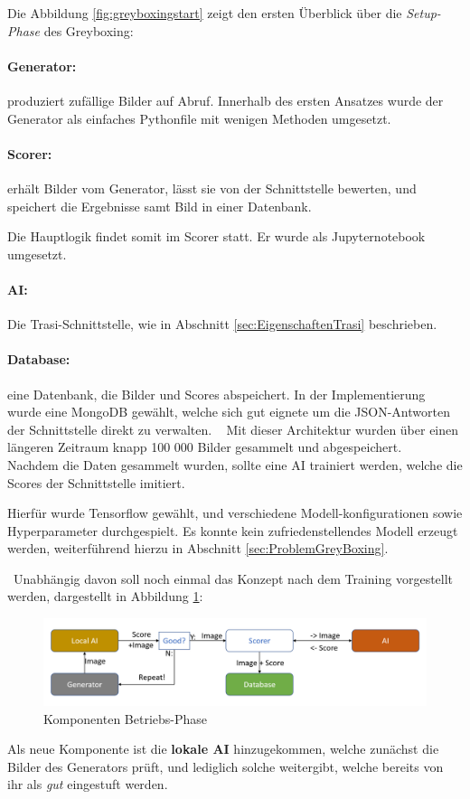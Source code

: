 Die Abbildung \ref{fig:greyboxingstart} zeigt den ersten Überblick über die \textit{Setup-Phase} des Greyboxing:

\paragraph{Generator:} produziert zufällige Bilder auf Abruf. Innerhalb des ersten Ansatzes wurde der Generator als einfaches Pythonfile mit wenigen Methoden umgesetzt.  
\paragraph{Scorer:} erhält Bilder vom Generator, lässt sie von der Schnittstelle bewerten, und speichert die Ergebnisse samt Bild in einer Datenbank. 

Die Hauptlogik findet somit im Scorer statt. Er wurde als Jupyternotebook umgesetzt.
\paragraph{AI:} Die Trasi-Schnittstelle, wie in Abschnitt \ref{sec:EigenschaftenTrasi} beschrieben.
\paragraph{Database:} eine Datenbank, die Bilder und Scores abspeichert.
In der Implementierung wurde eine MongoDB gewählt, welche sich gut eignete um die JSON-Antworten der Schnittstelle direkt zu verwalten. 
~\newline
Mit dieser Architektur wurden über einen längeren Zeitraum knapp 100 000 Bilder gesammelt und abgespeichert. 
~\newline
Nachdem die Daten gesammelt wurden, sollte eine AI trainiert werden, welche die Scores der Schnittstelle imitiert. 

Hierfür wurde Tensorflow gewählt, und verschiedene Modell-konfigurationen sowie Hyperparameter durchgespielt. 
Es konnte kein zufriedenstellendes Modell erzeugt werden, weiterführend hierzu in Abschnitt \ref{sec:ProblemGreyBoxing}.

~\newline Unabhängig davon soll noch einmal das Konzept nach dem Training vorgestellt werden, dargestellt in Abbildung \ref{fig:greyboxingrunning}: 
 \begin{figure}[h]
 	\centering
 	\includegraphics[width=0.9\linewidth]{Images/GreyBoxingRunning}
 	\caption{Komponenten Betriebs-Phase}
 	\label{fig:greyboxingrunning}
 \end{figure}
 Als neue Komponente ist die \textbf{lokale AI} hinzugekommen, welche zunächst die Bilder des Generators prüft, und lediglich solche weitergibt, welche bereits von ihr als \textit{gut} eingestuft werden. 
 
